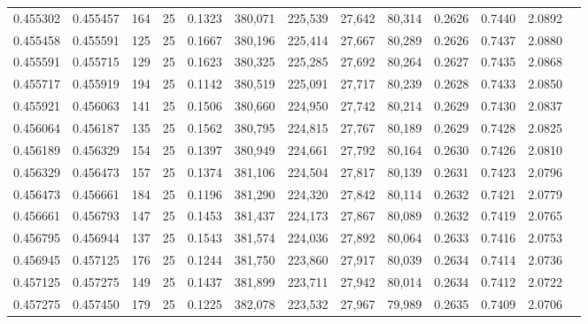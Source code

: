 \begin{tabular}{rrrrrrrrrrrrr}
0.455302 & 0.455457 &   164 &  25 &                                     0.1323 & 380,071 & 225,539 &  27,642 &  80,314 & 0.2626 & 0.7440 & 2.0892 \\
0.455458 & 0.455591 &   125 &  25 &                                     0.1667 & 380,196 & 225,414 &  27,667 &  80,289 & 0.2626 & 0.7437 & 2.0880 \\
0.455591 & 0.455715 &   129 &  25 &                                     0.1623 & 380,325 & 225,285 &  27,692 &  80,264 & 0.2627 & 0.7435 & 2.0868 \\
0.455717 & 0.455919 &   194 &  25 &                                     0.1142 & 380,519 & 225,091 &  27,717 &  80,239 & 0.2628 & 0.7433 & 2.0850 \\
0.455921 & 0.456063 &   141 &  25 &                                     0.1506 & 380,660 & 224,950 &  27,742 &  80,214 & 0.2629 & 0.7430 & 2.0837 \\
0.456064 & 0.456187 &   135 &  25 &                                     0.1562 & 380,795 & 224,815 &  27,767 &  80,189 & 0.2629 & 0.7428 & 2.0825 \\
0.456189 & 0.456329 &   154 &  25 &                                     0.1397 & 380,949 & 224,661 &  27,792 &  80,164 & 0.2630 & 0.7426 & 2.0810 \\
0.456329 & 0.456473 &   157 &  25 &                                     0.1374 & 381,106 & 224,504 &  27,817 &  80,139 & 0.2631 & 0.7423 & 2.0796 \\
0.456473 & 0.456661 &   184 &  25 &                                     0.1196 & 381,290 & 224,320 &  27,842 &  80,114 & 0.2632 & 0.7421 & 2.0779 \\
0.456661 & 0.456793 &   147 &  25 &                                     0.1453 & 381,437 & 224,173 &  27,867 &  80,089 & 0.2632 & 0.7419 & 2.0765 \\
0.456795 & 0.456944 &   137 &  25 &                                     0.1543 & 381,574 & 224,036 &  27,892 &  80,064 & 0.2633 & 0.7416 & 2.0753 \\
0.456945 & 0.457125 &   176 &  25 &                                     0.1244 & 381,750 & 223,860 &  27,917 &  80,039 & 0.2634 & 0.7414 & 2.0736 \\
0.457125 & 0.457275 &   149 &  25 &                                     0.1437 & 381,899 & 223,711 &  27,942 &  80,014 & 0.2634 & 0.7412 & 2.0722 \\
0.457275 & 0.457450 &   179 &  25 &                                     0.1225 & 382,078 & 223,532 &  27,967 &  79,989 & 0.2635 & 0.7409 & 2.0706 \\

\end{tabular}
